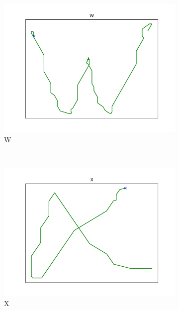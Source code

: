 \begin{figure}
\begin{subfigure}[b]{0.14\textwidth}
        \includegraphics[width=\textwidth]{images/gbem/orig_letters_fig/AORIG_letter_W_writer_2.png}
        \caption{W}
    \end{subfigure}
    ~
    \begin{subfigure}[b]{0.14\textwidth}
        \includegraphics[width=\textwidth]{images/gbem/orig_letters_fig/AORIG_letter_X_writer_5.png}
        \caption{X}
    \end{subfigure}
    ~
    \begin{subfigure}[b]{0.14\textwidth}

\end{subfigure}
\end{figure}
